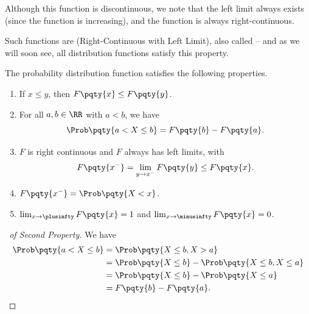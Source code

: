 Although this function is discontinuous, we note that the left limit always exists (since the function is increasing), and the function is always right-continuous.

Such functions are  (Right-Continuous with Left Limit), also called  -- and as we will soon see, all distribution functions satisfy this property.

The probability distribution function satisfies the following properties.

\begin{proposition}
    \label{prop:property-probability-distribution-fn}%
    \begin{enumerate}
        \item If \(x \leq y\), then \(F\pqty{x} \leq F\pqty{y}\).
        \item For all \(a, b \in \RR\) with \(a < b\), we have
        \[
            \Prob\pqty{a < X \leq b} = F\pqty{b} - F\pqty{a}.
        \]
        \item \(F\) is right continuous and \(F\) always has left limits, with
        \[
            F\pqty{x^-} = \lim_{y \to x^-} F\pqty{y} \leq F\pqty{x}.
        \]
        \item \(F\pqty{x^-} = \Prob\pqty{X < x}\).
        \item \(\lim_{x \to \plusinfty} F\pqty{x} = 1\) and \(\lim_{x \to \minusinfty} F\pqty{x} = 0\).
    \end{enumerate}
\end{proposition}

\begin{proof}[\proofname\ of Second Property]
    We have
    \begin{align*}
        \Prob\pqty{a < X \leq b} &= \Prob\pqty{X \leq b, X > a} \\
        &= \Prob\pqty{X \leq b} - \Prob\pqty{X \leq b, X \leq a} \\
        &= \Prob\pqty{X \leq b} - \Prob\pqty{X \leq a} \\
        &= F\pqty{b} - F\pqty{a}.
    \end{align*}
\end{proof}


